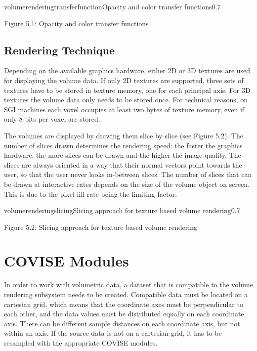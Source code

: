 \begin{covimg}{volumerendering}{transferfunction}{Opacity and color transfer functions}{0.7}\end{covimg}
\begin{htmlonly}
Figure 5.1: Opacity and color transfer functions
\vspace{0.5cm}
\end{htmlonly}

\subsection{Rendering Technique}

Depending on the available graphics hardware, either 2D or 3D textures are used for displaying the volume data. 
If only 2D textures are supported, three sets of textures have to be stored in texture memory, one for each 
principal axis. For 3D textures the volume data only needs to be stored once. For technical reasons, on SGI 
machines each voxel occupies at least two bytes of texture memory, even if only 8 bits per voxel are stored.

The volumes are displayed by drawing them slice by slice (see Figure 5.2). 
The number of slices drawn determines the rendering speed: 
the faster the graphics hardware, the more slices can be drawn and the higher the image quality. The 
slices are always oriented in a way that their normal vectors point towards the user, so that the user never 
looks in-between slices. The number of slices that can be drawn at interactive rates depends on
the size of the volume object on screen. This is due to the pixel fill rate being the limiting factor.

\begin{covimg}{volumerendering}{slicing}{Slicing approach for texture based volume rendering}{0.7}\end{covimg}
\begin{htmlonly}
Figure 5.2: Slicing approach for texture based volume rendering
\vspace{0.5cm}
\end{htmlonly}

\section{COVISE Modules}

In order to work with volumetric data, a dataset that is compatible to the volume rendering subsystem needs 
to be created. Compatible data must be located on a cartesian grid, which means that the coordinate axes must 
be perpendicular to each other, and the data values must be distributed equally on each coordinate axis. 
There can be different sample distances on each coordinate axis, but not within an axis. If the
source data is not on a cartesian grid, it has to be resampled with the appropriate COVISE modules. 

